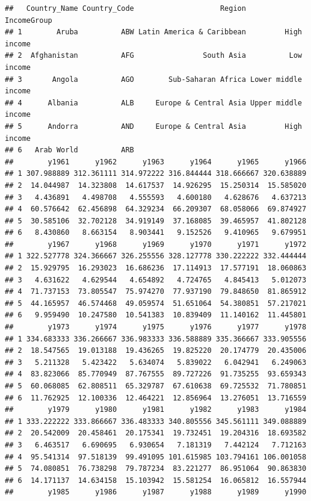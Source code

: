 \documentclass[]{book}
\begin{document}
\begin{verbatim}
##   Country_Name Country_Code                    Region         IncomeGroup
## 1        Aruba          ABW Latin America & Caribbean         High income
## 2  Afghanistan          AFG                South Asia          Low income
## 3       Angola          AGO        Sub-Saharan Africa Lower middle income
## 4      Albania          ALB     Europe & Central Asia Upper middle income
## 5      Andorra          AND     Europe & Central Asia         High income
## 6   Arab World          ARB                                              
##        y1961      y1962      y1963      y1964      y1965      y1966
## 1 307.988889 312.361111 314.972222 316.844444 318.666667 320.638889
## 2  14.044987  14.323808  14.617537  14.926295  15.250314  15.585020
## 3   4.436891   4.498708   4.555593   4.600180   4.628676   4.637213
## 4  60.576642  62.456898  64.329234  66.209307  68.058066  69.874927
## 5  30.585106  32.702128  34.919149  37.168085  39.465957  41.802128
## 6   8.430860   8.663154   8.903441   9.152526   9.410965   9.679951
##        y1967      y1968      y1969      y1970      y1971      y1972
## 1 322.527778 324.366667 326.255556 328.127778 330.222222 332.444444
## 2  15.929795  16.293023  16.686236  17.114913  17.577191  18.060863
## 3   4.631622   4.629544   4.654892   4.724765   4.845413   5.012073
## 4  71.737153  73.805547  75.974270  77.937190  79.848650  81.865912
## 5  44.165957  46.574468  49.059574  51.651064  54.380851  57.217021
## 6   9.959490  10.247580  10.541383  10.839409  11.140162  11.445801
##        y1973      y1974      y1975      y1976      y1977      y1978
## 1 334.683333 336.266667 336.983333 336.588889 335.366667 333.905556
## 2  18.547565  19.013188  19.436265  19.825220  20.174779  20.435006
## 3   5.211328   5.423422   5.634074   5.839022   6.042941   6.249063
## 4  83.823066  85.770949  87.767555  89.727226  91.735255  93.659343
## 5  60.068085  62.808511  65.329787  67.610638  69.725532  71.780851
## 6  11.762925  12.100336  12.464221  12.856964  13.276051  13.716559
##        y1979      y1980      y1981      y1982      y1983      y1984
## 1 333.222222 333.866667 336.483333 340.805556 345.561111 349.088889
## 2  20.542009  20.458461  20.175341  19.732451  19.204316  18.693582
## 3   6.463517   6.690695   6.930654   7.181319   7.442124   7.712163
## 4  95.541314  97.518139  99.491095 101.615985 103.794161 106.001058
## 5  74.080851  76.738298  79.787234  83.221277  86.951064  90.863830
## 6  14.171137  14.634158  15.103942  15.581254  16.065812  16.557944
##        y1985      y1986      y1987      y1988      y1989      y1990

\end{verbatim}
\end{document}
